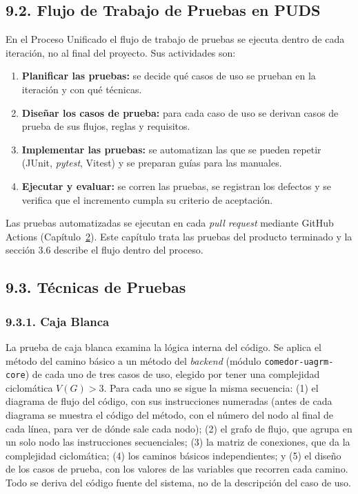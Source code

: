 \subsection{9.2. Flujo de Trabajo de Pruebas en PUDS}

En el Proceso Unificado el flujo de trabajo de pruebas se ejecuta dentro de cada iteración, no al final del proyecto. Sus actividades son:

\begin{enumerate}
    \item \textbf{Planificar las pruebas:} se decide qué casos de uso se prueban en la iteración y con qué técnicas.
    \item \textbf{Diseñar los casos de prueba:} para cada caso de uso se derivan casos de prueba de sus flujos, reglas y requisitos.
    \item \textbf{Implementar las pruebas:} se automatizan las que se pueden repetir (JUnit, \textit{pytest}, Vitest) y se preparan guías para las manuales.
    \item \textbf{Ejecutar y evaluar:} se corren las pruebas, se registran los defectos y se verifica que el incremento cumpla su criterio de aceptación.
\end{enumerate}

Las pruebas automatizadas se ejecutan en cada \textit{pull request} mediante GitHub Actions (Capítulo~\hyperref[cap:sqap]{2}). Este capítulo trata las pruebas del producto terminado y la sección 3.6 describe el flujo dentro del proceso.

\subsection{9.3. Técnicas de Pruebas}

\subsubsection{9.3.1. Caja Blanca}

La prueba de caja blanca examina la lógica interna del código. Se aplica el método del camino básico a un método del \textit{backend} (módulo \texttt{comedor-uagrm-core}) de cada uno de tres casos de uso, elegido por tener una complejidad ciclomática $V(G)>3$. Para cada uno se sigue la misma secuencia: (1) el diagrama de flujo del código, con sus instrucciones numeradas (antes de cada diagrama se muestra el código del método, con el número del nodo al final de cada línea, para ver de dónde sale cada nodo); (2) el grafo de flujo, que agrupa en un solo nodo las instrucciones secuenciales; (3) la matriz de conexiones, que da la complejidad ciclomática; (4) los caminos básicos independientes; y (5) el diseño de los casos de prueba, con los valores de las variables que recorren cada camino. Todo se deriva del código fuente del sistema, no de la descripción del caso de uso.


